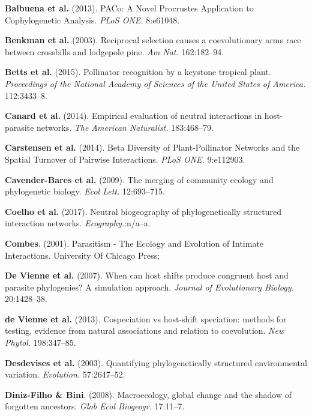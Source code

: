 \documentclass[11pt,serif]{article}
\begin{document}
\hypertarget{refs}{}
\hypertarget{ref-balb13pnp}{}
\textbf{Balbuena et al.} (2013). PACo: A Novel Procrustes Application to
Cophylogenetic Analysis. \emph{PLoS ONE.} 8:e61048.

\hypertarget{ref-benk03rsc}{}
\textbf{Benkman et al.} (2003). Reciprocal selection causes a
coevolutionary arms race between crossbills and lodgepole pine. \emph{Am
Nat.} 162:182--94.

\hypertarget{ref-bett15prk}{}
\textbf{Betts et al.} (2015). Pollinator recognition by a keystone
tropical plant. \emph{Proceedings of the National Academy of Sciences of
the United States of America.} 112:3433--8.

\hypertarget{ref-cana14een}{}
\textbf{Canard et al.} (2014). Empirical evaluation of neutral
interactions in host-parasite networks. \emph{The American Naturalist.}
183:468--79.

\hypertarget{ref-cars14bdp}{}
\textbf{Carstensen et al.} (2014). Beta Diversity of Plant-Pollinator
Networks and the Spatial Turnover of Pairwise Interactions. \emph{PLoS
ONE.} 9:e112903.

\hypertarget{ref-cave09mce}{}
\textbf{Cavender-Bares et al.} (2009). The merging of community ecology
and phylogenetic biology. \emph{Ecol Lett.} 12:693--715.

\hypertarget{ref-coel17nbp}{}
\textbf{Coelho et al.} (2017). Neutral biogeography of phylogenetically
structured interaction networks. \emph{Ecography.}:n/a--a.

\hypertarget{ref-comb01pee}{}
\textbf{Combes}. (2001). Parasitism - The Ecology and Evolution of
Intimate Interactions. University Of Chicago Press;

\hypertarget{ref-dev07wch}{}
\textbf{De Vienne et al.} (2007). When can host shifts produce congruent
host and parasite phylogenies? A simulation approach. \emph{Journal of
Evolutionary Biology.} 20:1428--38.

\hypertarget{ref-dev13cvh}{}
\textbf{de Vienne et al.} (2013). Cospeciation vs host-shift speciation:
methods for testing, evidence from natural associations and relation to
coevolution. \emph{New Phytol.} 198:347--85.

\hypertarget{ref-desd03qps}{}
\textbf{Desdevises et al.} (2003). Quantifying phylogenetically
structured environmental variation. \emph{Evolution.} 57:2647--52.

\hypertarget{ref-dini08mgc}{}
\textbf{Diniz-Filho \& Bini}. (2008). Macroecology, global change and
the shadow of forgotten ancestors. \emph{Glob Ecol Biogeogr.} 17:11--7.
\end{document}

